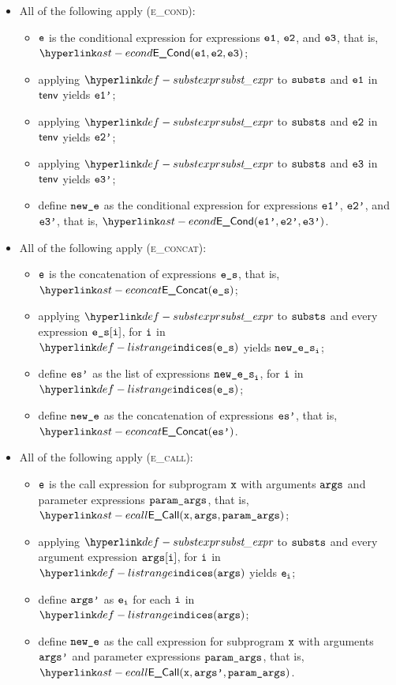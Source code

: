 \begin{itemize}
  \item All of the following apply (\textsc{e\_cond}):
  \begin{itemize}
    \item $\texttt{e}$ is the conditional expression for expressions $\texttt{e1}$, $\texttt{e2}$, and $\texttt{e3}$, that is, \\
          $\ECond(\veone, \vetwo, \vethree)$;
    \item applying $\substexpr$ to $\texttt{substs}$ and $\texttt{e1}$ in $\textsf{tenv}$ yields $\texttt{e1'}$;
    \item applying $\substexpr$ to $\texttt{substs}$ and $\texttt{e2}$ in $\textsf{tenv}$ yields $\texttt{e2'}$;
    \item applying $\substexpr$ to $\texttt{substs}$ and $\texttt{e3}$ in $\textsf{tenv}$ yields $\texttt{e3'}$;
    \item define $\texttt{new\_e}$ as the conditional expression for expressions $\texttt{e1'}$, $\texttt{e2'}$, and $\texttt{e3'}$, that is, $\ECond(\veonep, \vetwop, \vethreep)$.
  \end{itemize}

  \item All of the following apply (\textsc{e\_concat}):
  \begin{itemize}
    \item $\texttt{e}$ is the concatenation of expressions $\texttt{e\_s}$, that is, $\EConcat(\ves)$;
    \item applying $\substexpr$ to $\texttt{substs}$ and every expression $\texttt{e\_s}[\texttt{i}]$, for $\texttt{i}$ in \\
          $\listrange(\ves)$ yields $\texttt{new\_e\_s}_{\texttt{i}}$;
    \item define $\texttt{es'}$ as the list of expressions $\texttt{new\_e\_s}_{\texttt{i}}$, for $\texttt{i}$ in $\listrange(\ves)$;
    \item define $\texttt{new\_e}$ as the concatenation of expressions $\texttt{es'}$, that is, $\EConcat(\vesp)$.
  \end{itemize}

  \item All of the following apply (\textsc{e\_call}):
  \begin{itemize}
    \item $\texttt{e}$ is the call expression for subprogram $\texttt{x}$ with arguments $\texttt{args}$ and parameter expressions $\texttt{param\_args}$,
          that is, $\ECall(\vx, \vargs, \paramargs)$;
    \item applying $\substexpr$ to $\texttt{substs}$ and every argument expression $\texttt{args}[\texttt{i}]$, for $\texttt{i}$ in
          $\listrange(\vargs)$ yields $\texttt{e}_{\texttt{i}}$;
    \item define $\texttt{args'}$ as $\texttt{e}_{\texttt{i}}$ for each $\texttt{i}$ in $\listrange(\vargs)$;
    \item define $\texttt{new\_e}$ as the call expression for subprogram $\texttt{x}$ with arguments $\texttt{args'}$ and parameter expressions $\texttt{param\_args}$,
    that is, $\ECall(\vx, \vargsp, \paramargs)$.
  \end{itemize}


\end{itemize}
